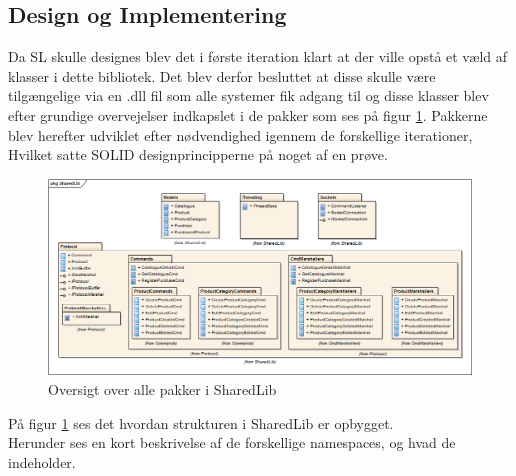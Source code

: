 \subsection{Design og Implementering}

Da \gls{SL} skulle designes blev det i første iteration klart at der ville opstå et væld af klasser i dette bibliotek. Det blev derfor besluttet at disse skulle være tilgængelige via en .dll fil som alle systemer fik adgang til og disse klasser blev efter grundige overvejelser indkapslet i de pakker som ses på figur \ref{fig:oversigtSL}. Pakkerne blev herefter udviklet efter nødvendighed igennem de forskellige iterationer, Hvilket satte SOLID designprincipperne på noget af en prøve.

\begin{figure}[!h]
    \centering
    \includegraphics[width=1.0\textwidth]{Systemdesign/SharedLib/Images/SharedLib_Package.png}
    \caption{Oversigt over alle pakker i SharedLib}
    \label{fig:oversigtSL}
\end{figure}

På figur \ref{fig:oversigtSL} ses det hvordan strukturen i SharedLib er opbygget.  \\

Herunder ses en kort beskrivelse af de forskellige namespaces, og hvad de indeholder.


